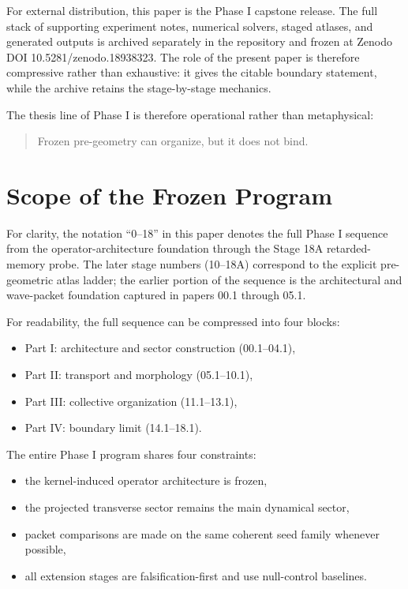 \documentclass[11pt]{article}
\begin{document}
For external distribution, this paper is the Phase I capstone release. The full stack of supporting experiment notes, numerical solvers, staged atlases, and generated outputs is archived separately in the repository and frozen at Zenodo DOI 10.5281/zenodo.18938323. The role of the present paper is therefore compressive rather than exhaustive: it gives the citable boundary statement, while the archive retains the stage-by-stage mechanics.

The thesis line of Phase I is therefore operational rather than metaphysical:
\begin{quote}
Frozen pre-geometry can organize, but it does not bind.
\end{quote}

\section{Scope of the Frozen Program}

For clarity, the notation ``0--18'' in this paper denotes the full Phase I sequence from the operator-architecture foundation through the Stage 18A retarded-memory probe. The later stage numbers (10--18A) correspond to the explicit pre-geometric atlas ladder; the earlier portion of the sequence is the architectural and wave-packet foundation captured in papers 00.1 through 05.1.

For readability, the full sequence can be compressed into four blocks:
\begin{itemize}
\item Part I: architecture and sector construction (00.1--04.1),
\item Part II: transport and morphology (05.1--10.1),
\item Part III: collective organization (11.1--13.1),
\item Part IV: boundary limit (14.1--18.1).
\end{itemize}

The entire Phase I program shares four constraints:
\begin{itemize}
\item the kernel-induced operator architecture is frozen,
\item the projected transverse sector remains the main dynamical sector,
\item packet comparisons are made on the same coherent seed family whenever possible,
\item all extension stages are falsification-first and use null-control baselines.
\end{itemize}
\end{document}
